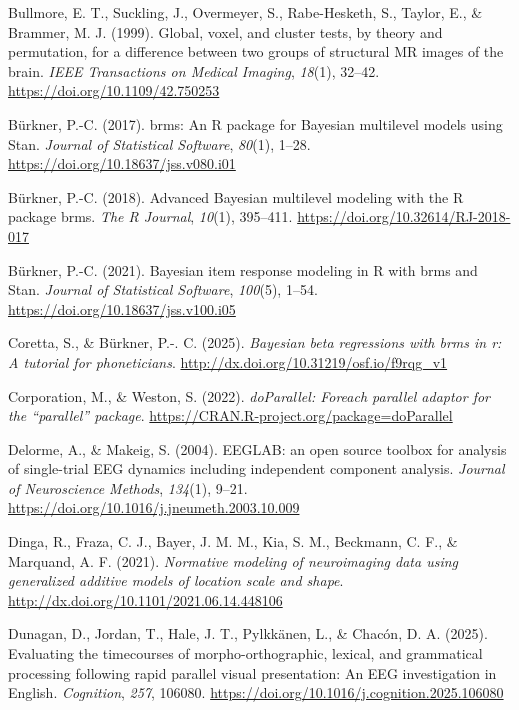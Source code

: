 \documentclass[
  doc,
  floatsintext,
  longtable,
  a4paper,
  nolmodern,
  notxfonts,
  notimes,
  donotrepeattitle,
  colorlinks=true,linkcolor=blue,citecolor=blue,urlcolor=blue]{apa7}
\newlength{\cslhangindent}
\newenvironment{CSLReferences}[2] %
 {\begin{list}{}{%
  \setlength{\itemindent}{0pt}
  \setlength{\leftmargin}{0pt}
  \setlength{\parsep}{0pt}
  \ifodd #1
   \setlength{\leftmargin}{\cslhangindent}
   \setlength{\itemindent}{-1\cslhangindent}
  \fi
  \setlength{\itemsep}{#2\baselineskip}}}
 {\end{list}}
\begin{document}
\begin{CSLReferences}{1}{0}
Bullmore, E. T., Suckling, J., Overmeyer, S., Rabe-Hesketh, S., Taylor,
E., \& Brammer, M. J. (1999). Global, voxel, and cluster tests, by
theory and permutation, for a difference between two groups of
structural MR images of the brain. \emph{IEEE Transactions on Medical
Imaging}, \emph{18}(1), 32--42. \url{https://doi.org/10.1109/42.750253}

Bürkner, P.-C. (2017). {brms}: An {R} package for {Bayesian} multilevel
models using {Stan}. \emph{Journal of Statistical Software},
\emph{80}(1), 1--28. \url{https://doi.org/10.18637/jss.v080.i01}

Bürkner, P.-C. (2018). Advanced {Bayesian} multilevel modeling with the
{R} package {brms}. \emph{The R Journal}, \emph{10}(1), 395--411.
\url{https://doi.org/10.32614/RJ-2018-017}

Bürkner, P.-C. (2021). Bayesian item response modeling in {R} with
{brms} and {Stan}. \emph{Journal of Statistical Software},
\emph{100}(5), 1--54. \url{https://doi.org/10.18637/jss.v100.i05}

Coretta, S., \& Bürkner, P.-. C. (2025). \emph{Bayesian beta regressions
with brms in r: A tutorial for phoneticians}.
\url{http://dx.doi.org/10.31219/osf.io/f9rqg_v1}

Corporation, M., \& Weston, S. (2022). \emph{{doParallel}: Foreach
parallel adaptor for the {``{parallel}''} package}.
\url{https://CRAN.R-project.org/package=doParallel}

Delorme, A., \& Makeig, S. (2004). EEGLAB: an open source toolbox for
analysis of single-trial EEG dynamics including independent component
analysis. \emph{Journal of Neuroscience Methods}, \emph{134}(1), 9--21.
\url{https://doi.org/10.1016/j.jneumeth.2003.10.009}

Dinga, R., Fraza, C. J., Bayer, J. M. M., Kia, S. M., Beckmann, C. F.,
\& Marquand, A. F. (2021). \emph{Normative modeling of neuroimaging data
using generalized additive models of location scale and shape}.
\url{http://dx.doi.org/10.1101/2021.06.14.448106}

Dunagan, D., Jordan, T., Hale, J. T., Pylkkänen, L., \& Chacón, D. A.
(2025). Evaluating the timecourses of morpho-orthographic, lexical, and
grammatical processing following rapid parallel visual presentation: An
EEG investigation in English. \emph{Cognition}, \emph{257}, 106080.
\url{https://doi.org/10.1016/j.cognition.2025.106080}


\end{CSLReferences}
\end{document}
